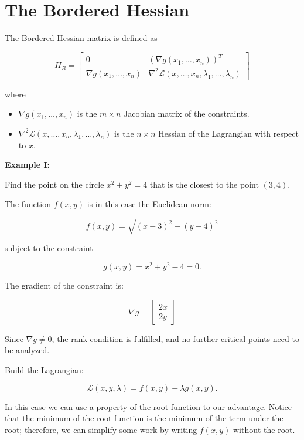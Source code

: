 \section{The Bordered Hessian}

The Bordered Hessian matrix is defined as

\[
    H_B =
    \begin{bmatrix}
    0 & {\left( \nabla g(x_1, \dots, x_n) \right)}^T \\
    \nabla g(x_1, \dots, x_n) & \nabla^2 \mathcal{L}(x, \dots, x_n, \lambda_1, \dots, \lambda_n)
    \end{bmatrix}
\]

where

\begin{itemize}

    \item \( \nabla  g(x_1, \dots, x_n) \) is the \( m \times n \) Jacobian matrix of the constraints.

    \item \( \nabla^2 \mathcal{L}(x, \dots, x_n, \lambda_1, \dots, \lambda_n) \) is the \( n \times n \) 
    Hessian of the Lagrangian with respect to \(x\).

\end{itemize}

\textbf{Example I:}

Find the point on the circle \(x^2 + y^2 = 4\) that is the closest to the point \((3,4)\).

The function \(f(x,y)\) is in this case the Euclidean norm:

\[
    f(x, y) = \sqrt{(x - 3)^2 + (y - 4)^2}
\]

subject to the constraint

\[
    g(x, y) = x^2 + y^2 - 4 = 0.
\]

The gradient of the constraint is:

\[
    \nabla g = \begin{bmatrix} 2x \\ 2y \end{bmatrix}
\]

Since \( \nabla g \ne 0 \), the rank condition is fulfilled, and no further critical points 
need to be analyzed.

Build the Lagrangian:

\[
    \mathcal{L}(x, y, \lambda) = f(x, y) + \lambda g(x, y).
\]

In this case we can use a property of the root function to our advantage. Notice that the minimum 
of the root function is the minimum of the term under the root; therefore, we can simplify some work by writing 
\(f(x,y)\) without the root. 

